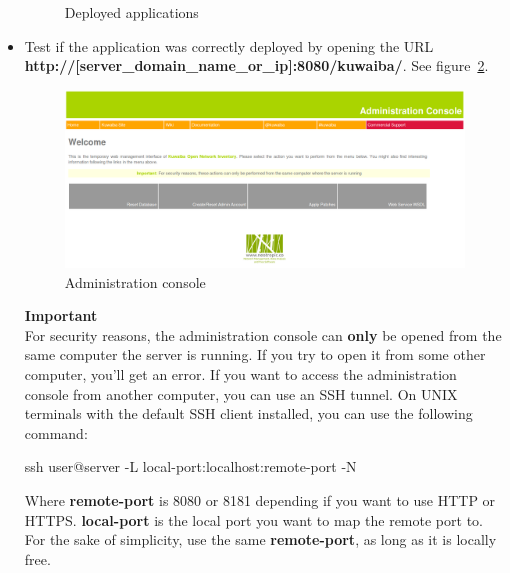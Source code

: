\documentclass[a4paper]{article}
\begin{document}
\begin{itemize}
\begin{figure}[h!]
					\caption{Deployed applications}
					\label{fig:dapplications}		  
				\end{figure}				
				\item Test if the application was correctly deployed by opening the URL \\ \textbf{http://[server\_domain\_name\_or\_ip]:8080/kuwaiba/}. See figure~\ref{fig:kw_managementconsole}.
				\begin{figure}[h!]
					\includegraphics[width=\linewidth]{img/kw_management_console.png} 	
					\caption{Administration console}
					\label{fig:kw_managementconsole}
				\end{figure}
				
				\begin{framed} {\large \textbf{Important}} \\
					For security reasons, the administration console can \textbf{only} be opened from the same computer the server is running. If you try to open it from some other computer, you'll get an error. If you want to access the administration console from another computer, you can use an SSH tunnel. On UNIX terminals with the default SSH client installed, you can use the following command:
					
						ssh user@server -L local-port:localhost:remote-port -N
					
					Where \textbf{remote-port} is 8080 or 8181 depending if you want to use HTTP or HTTPS. \textbf{local-port} is the local port you want to map the remote port to. For the sake of simplicity, use the same \textbf{remote-port}, as long as it is locally free.
					

\end{framed}
\end{itemize}
\end{document}
